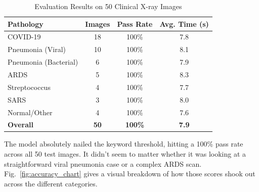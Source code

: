 \documentclass[conference]{IEEEtran}
\begin{document}
\begin{table}[htbp]
\centering
\caption{Evaluation Results on 50 Clinical X-ray Images}
\label{tab:results}
\begin{tabular}{@{}lccc@{}}
\toprule
\textbf{Pathology} & \textbf{Images} & \textbf{Pass Rate} & \textbf{Avg. Time (s)} \\
\midrule
COVID-19 & 18 & 100\% & 7.8 \\
Pneumonia (Viral) & 10 & 100\% & 8.1 \\
Pneumonia (Bacterial) & 6 & 100\% & 7.9 \\
ARDS & 5 & 100\% & 8.3 \\
Streptococcus & 4 & 100\% & 7.7 \\
SARS & 3 & 100\% & 8.0 \\
Normal/Other & 4 & 100\% & 7.6 \\
\midrule
\textbf{Overall} & \textbf{50} & \textbf{100\%} & \textbf{7.9} \\
\bottomrule
\end{tabular}
\end{table}

The model absolutely nailed the keyword threshold, hitting a 100\% pass rate across all 50 test images. It didn't seem to matter whether it was looking at a straightforward viral pneumonia case or a complex ARDS scan. Fig.~\ref{fig:accuracy_chart} gives a visual breakdown of how those scores shook out across the different categories.
\end{document}
